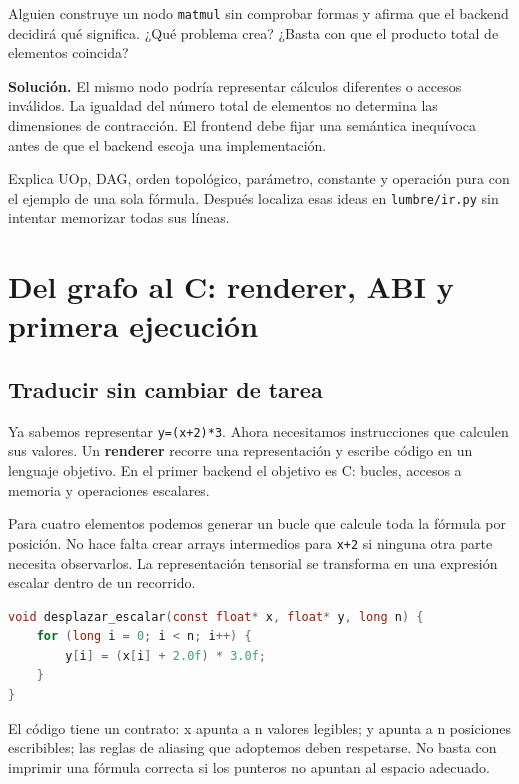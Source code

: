 \documentclass[12pt,a4paper,oneside]{report}
\begin{document}
\begin{practica}
Alguien construye un nodo \texttt{matmul} sin comprobar formas y afirma que el backend decidirá qué significa. ¿Qué problema crea? ¿Basta con que el producto total de elementos coincida?

\end{practica}
\textbf{Solución.} El mismo nodo podría representar cálculos diferentes o accesos inválidos. La igualdad del número total de elementos no determina las dimensiones de contracción. El frontend debe fijar una semántica inequívoca antes de que el backend escoja una implementación.

\begin{comprueba}
Explica UOp, DAG, orden topológico, parámetro, constante y operación pura con el ejemplo de una sola fórmula. Después localiza esas ideas en \texttt{lumbre/ir.py} sin intentar memorizar todas sus líneas.

\end{comprueba}
\chapter{Del grafo al C: renderer, ABI y primera ejecución}
\label{ch:renderer}
\section{Traducir sin cambiar de tarea}
Ya sabemos representar \texttt{y=(x+2)*3}. Ahora necesitamos instrucciones que calculen sus valores. Un \textbf{renderer} recorre una representación y escribe código en un lenguaje objetivo. En el primer backend el objetivo es C: bucles, accesos a memoria y operaciones escalares.

Para cuatro elementos podemos generar un bucle que calcule toda la fórmula por posición. No hace falta crear arrays intermedios para \texttt{x+2} si ninguna otra parte necesita observarlos. La representación tensorial se transforma en una expresión escalar dentro de un recorrido.

\begin{lstlisting}[language=C]
void desplazar_escalar(const float* x, float* y, long n) {
    for (long i = 0; i < n; i++) {
        y[i] = (x[i] + 2.0f) * 3.0f;
    }
}
\end{lstlisting}
El código tiene un contrato: x apunta a n valores legibles; y apunta a n posiciones escribibles; las reglas de aliasing que adoptemos deben respetarse. No basta con imprimir una fórmula correcta si los punteros no apuntan al espacio adecuado.
\end{document}
